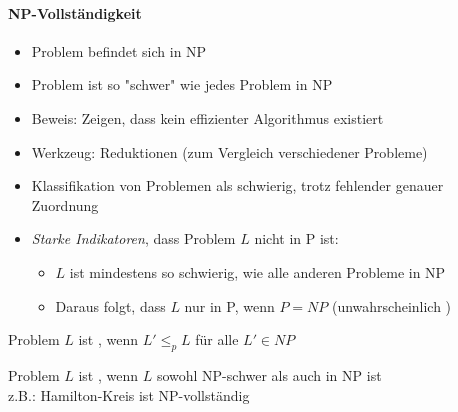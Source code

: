 \documentclass[
    ngerman,
    color=3b,
    dark_mode,
    load_common, %
    summary,
    boxarc,
]{rubos-tuda-template}
\begin{document}
\paragraph{NP-Vollständigkeit}
\begin{itemize}
      \item Problem befindet sich in NP
      \item Problem ist so \string"schwer\string" wie jedes Problem in NP
      \item Beweis: Zeigen, dass kein effizienter Algorithmus existiert
      \item Werkzeug: Reduktionen (zum Vergleich verschiedener Probleme)
\end{itemize}
\begin{definition}\mbox{}
      \begin{itemize}
            \item Klassifikation von Problemen als schwierig, trotz fehlender genauer Zuordnung
            \item \textit{Starke Indikatoren}, dass Problem $L$ nicht in P ist:
                  \begin{itemize}
                        \item $L$ ist mindestens so schwierig, wie alle anderen Probleme in NP
                        \item Daraus folgt, dass $L$ nur in P, wenn $P=NP$ (unwahrscheinlich )
                  \end{itemize}
      \end{itemize}
\end{definition}
\begin{definition}[NP-Schwer]
      Problem $L$ ist , wenn $L' \leq_p L$ für alle $L' \in NP$
\end{definition}
\begin{definition}[NP-Vollständig]
      Problem $L$ ist , wenn $L$ sowohl NP-schwer als auch in NP ist\\
      z.B.: Hamilton-Kreis ist NP-vollständig
\end{definition}

\clearpage
\end{document}
